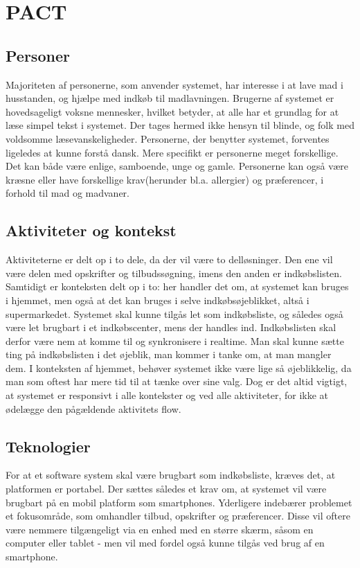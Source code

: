 \chapter{PACT}

\section{Personer}
Majoriteten af personerne, som anvender systemet, har interesse i at lave mad i husstanden, og hjælpe med indkøb til madlavningen.
Brugerne af systemet er hovedsageligt voksne mennesker, hvilket betyder, at alle har et grundlag for at læse simpel tekst i systemet.
Der tages hermed ikke hensyn til blinde, og folk med voldsomme læsevanskeligheder.
Personerne, der benytter systemet, forventes ligeledes at kunne forstå dansk.
Mere specifikt er personerne meget forskellige.
Det kan både være enlige, samboende, unge og gamle.
Personerne kan også være kræsne eller have forskellige krav(herunder bl.a. allergier) og præferencer, i forhold til mad og madvaner.

\section{Aktiviteter og kontekst}
Aktiviteterne er delt op i to dele, da der vil være to delløsninger. 
Den ene vil være delen med opskrifter og tilbudssøgning, imens den anden er indkøbslisten.
Samtidigt er konteksten delt op i to: her handler det om, at systemet kan bruges i hjemmet, men også at det kan bruges i selve indkøbsøjeblikket, altså i supermarkedet.
Systemet skal kunne tilgås let som indkøbsliste, og således også være let brugbart i et indkøbscenter, mens der handles ind.
Indkøbslisten skal derfor være nem at komme til og synkronisere i realtime.
Man skal kunne sætte ting på indkøbslisten i det øjeblik, man kommer i tanke om, at man mangler dem.
I konteksten af hjemmet, behøver systemet ikke være lige så øjeblikkelig, da man som oftest har mere tid til at tænke over sine valg.
Dog er det altid vigtigt, at systemet er responsivt i alle kontekster og ved alle aktiviteter, for ikke at ødelægge den pågældende aktivitets flow. 

\section{Teknologier}
For at et software system skal være brugbart som indkøbsliste, kræves det, at platformen er portabel.
Der sættes således et krav om, at systemet vil være brugbart på en mobil platform som smartphones.
Yderligere indebærer problemet et fokusområde, som omhandler tilbud, opskrifter og præferencer.
Disse vil oftere være nemmere tilgængeligt via en enhed med en større skærm, såsom en computer eller tablet - men vil med fordel også kunne tilgås ved brug af en smartphone. 	